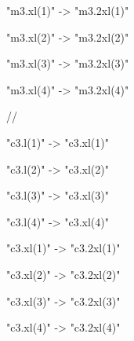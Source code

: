 {  "m3.xl(1)" -> "m3.2xl(1)" 
  
  "m3.xl(2)" -> "m3.2xl(2)"
  
  "m3.xl(3)" -> "m3.2xl(3)"
  
  "m3.xl(4)" -> "m3.2xl(4)"

   //

  "c3.l(1)" -> "c3.xl(1)"
   
  "c3.l(2)" -> "c3.xl(2)"
  
  "c3.l(3)" -> "c3.xl(3)"
  
  "c3.l(4)" -> "c3.xl(4)" 
  
  "c3.xl(1)" -> "c3.2xl(1)" 
  
  "c3.xl(2)" -> "c3.2xl(2)"
  
  "c3.xl(3)" -> "c3.2xl(3)"
  
  "c3.xl(4)" -> "c3.2xl(4)"
}